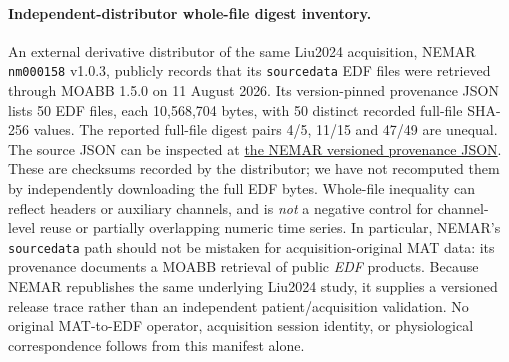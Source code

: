 \paragraph{Independent-distributor whole-file digest inventory.}
An external derivative distributor of the same Liu2024 acquisition,
NEMAR \texttt{nm000158} v1.0.3, publicly records that its
\texttt{sourcedata} EDF files were retrieved through MOABB 1.5.0
on 11 August 2026. Its version-pinned provenance JSON lists
50 EDF files, each 10,568,704 bytes, with 50 distinct
recorded full-file SHA-256 values. The reported full-file
digest pairs 4/5, 11/15 and 47/49 are unequal.
The source JSON can be inspected at
\href{https://github.com/nemarDatasets/nm000158/blob/11e3eeb4b439d5f8ee1b5e3b8e6032824bc2de83/sourcedata/sourcedata_provenance.json}{the NEMAR versioned provenance JSON}.
These are checksums recorded by the distributor;
we have not recomputed them by independently downloading
the full EDF bytes. Whole-file inequality can reflect
headers or auxiliary channels, and is \emph{not}
a negative control for channel-level reuse or partially
overlapping numeric time series. In particular,
NEMAR's \texttt{sourcedata} path should not be mistaken
for acquisition-original MAT data: its provenance
documents a MOABB retrieval of public \emph{EDF} products.
Because NEMAR republishes the same underlying Liu2024
study, it supplies a versioned release trace rather than
an independent patient/acquisition validation.
No original MAT-to-EDF operator, acquisition session
identity, or physiological correspondence follows from
this manifest alone.

